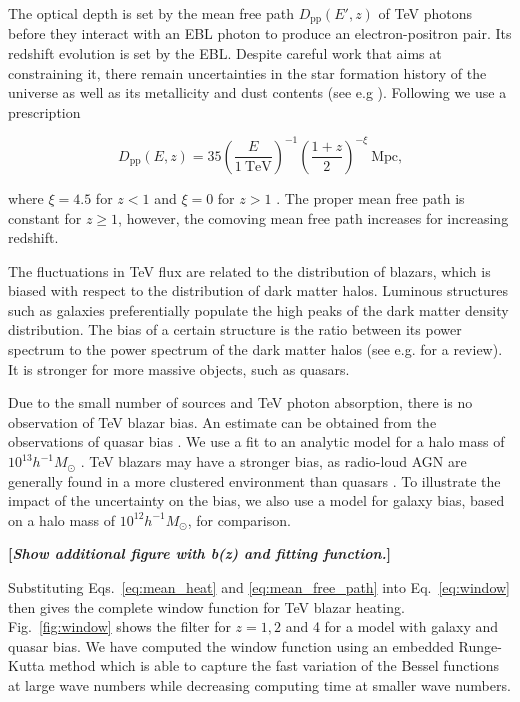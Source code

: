 \documentclass[twocolumns]{emulateapj}
\newcommand\Cc[1]{{\color{blue} \bf #1}} %
\begin{document}
The optical depth is set by the mean free path  $D_\mathrm{pp}(E',z)$ of  TeV photons before they interact with an EBL photon to produce an electron-positron pair. Its redshift evolution is set by the EBL. Despite careful work that aims at constraining it, there remain uncertainties in the star formation history of the universe as well as its metallicity and dust contents (see e.g \citet{2008A&A...487..837F,2006ApJ...648..774S}).  Following \citet{2012ApJ...752...23C} we use  a prescription 

  \begin{equation}
    \label{eq:mean_free_path}
  D_{\mathrm{pp}}(E,z)=35\left(\frac{E}{1~\textrm{TeV}}\right)^{-1} \left(\frac{1+z}{2}\right)^{-\xi}~\textrm{Mpc,}   
  \end{equation}

where $\xi=4.5$ for $z<1$ and $\xi=0$ for $z>1$ \citep{2004A&A...413..807K,2009PhRvD..80l3012N}. The proper mean free path is constant for $z\geq 1$, however, the comoving mean free path increases for increasing redshift.



The  fluctuations in TeV flux are related to the distribution of blazars, which is biased with respect to the distribution of dark matter halos. Luminous structures such as galaxies preferentially populate the high peaks of the dark matter density distribution.  The bias of a certain structure is the ratio between its power spectrum to the power spectrum of the dark matter halos (see e.g. \citet{2002PhR...372....1C} for a review). It is stronger for more massive objects, such as quasars. 

Due to the small number of sources and TeV photon absorption, there is no observation of  TeV blazar bias. An estimate can be obtained from the observations of quasar bias \citep{2005MNRAS.356..415C,2007ApJ...658...85M,2007AJ....133.2222S}. We use a fit to an analytic model for a halo mass of $10^{13}h^{-1}M_{\odot}$ \citep{2008ApJ...678..627B}.  TeV blazars may have a stronger bias, as radio-loud AGN are generally found in a more clustered environment than quasars \citep{2009MNRAS.393..377M,2012MNRAS.421.3060S}. To illustrate the impact of the uncertainty on the bias, we also use a model for galaxy bias, based on a  halo mass of $10^{12}h^{-1} M_{\odot}$,  for comparison. 

\Cc{[{\em Show additional figure with b(z) and fitting function.}]}

Substituting Eqs.~\eqref{eq:mean_heat} and \ref{eq:mean_free_path} into Eq.~\eqref{eq:window} then gives the complete window function for TeV blazar heating. Fig.~\ref{fig:window} shows the filter for $z=1,2$ and 4 for a model with galaxy and quasar bias. We have computed the window function using an embedded Runge-Kutta method which is able to capture the fast variation of the Bessel functions at large wave numbers while decreasing computing time at smaller wave numbers.
\end{document}

